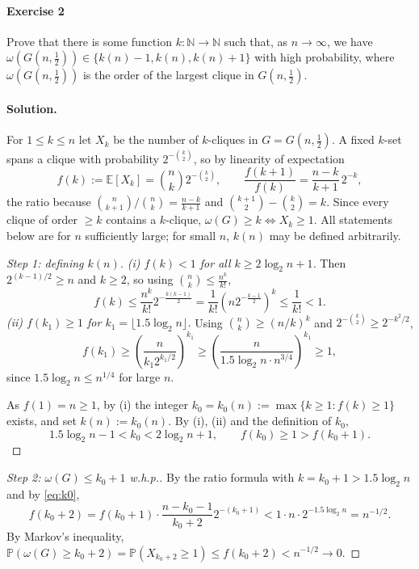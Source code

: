 \documentclass[a4paper,12pt]{article}
\newcommand{\mb}[1]{\mathbb{#1}}
\begin{document}
\paragraph{Exercise 2}  Prove that there is some function $k: \mathbb{N} \to \mathbb{N}$ such that, as $n \to \infty$, we have $\omega\left(G(n,\frac12) \right) \in \{ k(n) - 1, k(n), k(n) + 1 \}$ with high probability, where $\omega \left( G(n,\frac12) \right)$ is the order of the largest clique in $G(n,\frac12)$.

\paragraph{Solution.} For $1 \le k \le n$ let $X_k$ be the number of $k$-cliques in $G = G(n, \frac12)$. A fixed $k$-set spans a clique with probability $2^{-\binom k2}$, so by linearity of expectation
\[
	f(k) := \mb E[X_k] = \binom nk 2^{-\binom k2}, \qquad \frac{f(k+1)}{f(k)} = \frac{n-k}{k+1} \, 2^{-k},
\]
the ratio because $\binom{n}{k+1} / \binom nk = \frac{n-k}{k+1}$ and $\binom{k+1}{2} - \binom k2 = k$. Since every clique of order $\ge k$ contains a $k$-clique, $\omega(G) \ge k \iff X_k \ge 1$. All statements below are for $n$ sufficiently large; for small $n$, $k(n)$ may be defined arbitrarily.

\begin{proof}[Step 1: defining $k(n)$]
	\emph{(i) $f(k) < 1$ for all $k \ge 2 \log_2 n + 1$.} Then $2^{(k-1)/2} \ge n$ and $k \ge 2$, so using $\binom nk \le \frac{n^k}{k!}$,
	\[
		f(k) \le \frac{n^k}{k!} 2^{-\frac{k(k-1)}{2}} = \frac{1}{k!} \left( n 2^{-\frac{k-1}{2}} \right)^k \le \frac{1}{k!} < 1.
	\]
	\emph{(ii) $f(k_1) \ge 1$ for $k_1 = \lfloor 1.5 \log_2 n \rfloor$.} Using $\binom nk \ge (n/k)^k$ and $2^{-\binom k2} \ge 2^{-k^2/2}$,
	\[
		f(k_1) \ge \left( \frac{n}{k_1 2^{k_1/2}} \right)^{k_1} \ge \left( \frac{n}{1.5 \log_2 n \cdot n^{3/4}} \right)^{k_1} \ge 1,
	\]
	since $1.5 \log_2 n \le n^{1/4}$ for large $n$.

	As $f(1) = n \ge 1$, by (i) the integer $k_0 = k_0(n) := \max\{ k \ge 1 : f(k) \ge 1 \}$ exists, and set $k(n) := k_0(n)$. By (i), (ii) and the definition of $k_0$,
	\begin{equation}
		1.5 \log_2 n - 1 < k_0 < 2 \log_2 n + 1, \qquad f(k_0) \ge 1 > f(k_0 + 1). \label{eq:k0} \tag{1}
	\end{equation}
\end{proof}

\begin{proof}[Step 2: $\omega(G) \le k_0 + 1$ w.h.p.]
	By the ratio formula with $k = k_0 + 1 > 1.5 \log_2 n$ and by \eqref{eq:k0},
	\[
		f(k_0 + 2) = f(k_0 + 1) \cdot \frac{n - k_0 - 1}{k_0 + 2} 2^{-(k_0+1)} < 1 \cdot n \cdot 2^{-1.5 \log_2 n} = n^{-1/2}.
	\]
	By Markov's inequality, $\mb P(\omega(G) \ge k_0 + 2) = \mb P(X_{k_0+2} \ge 1) \le f(k_0 + 2) < n^{-1/2} \to 0$.
\end{proof}
\end{document}
